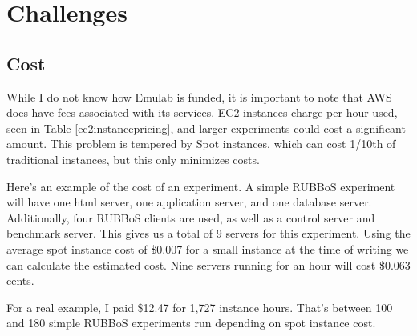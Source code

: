 \documentclass{article}
\begin{document}
\section{Challenges}
\subsection{Cost}
While I do not know how Emulab is funded, it is important to note that AWS does have fees associated with its services. EC2 instances charge per hour used, seen in Table \ref{ec2instancepricing}, and larger experiments could cost a significant amount. This problem is tempered by Spot instances, which can cost 1/10th of traditional instances, but this only minimizes costs.

Here's an example of the cost of an experiment. A simple RUBBoS experiment will have one html server, one application server, and one database server. Additionally, four RUBBoS clients are used, as well as a control server and benchmark server. This gives us a total of 9 servers for this experiment. Using the average spot instance cost of \$0.007 for a small instance at the time of writing we can calculate the estimated cost. Nine servers running for an hour will cost \$0.063 cents.

For a real example, I paid \$12.47 for 1,727 instance hours. That's between 100 and 180 simple RUBBoS experiments run depending on spot instance cost.
\end{document}
